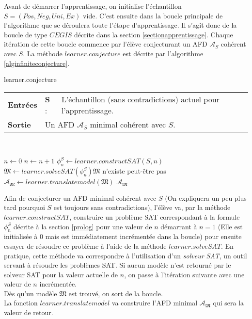 \documentclass[12pt,a4paper,oneside,titlepage]{report}
\begin{document}
\noindent Avant de démarrer l'apprentissage, on initialise l'échantillon $S=(Pos,Neg,Uni,Ex)$ vide. C'est ensuite dans la boucle principale de l'algorithme que se déroulera toute l'étape d'apprentissage. Il s'agit donc de la boucle de type $CEGIS$ décrite dans la section \ref{sectionapprentissage}. Chaque itération de cette boucle commence par l'élève conjecturant un AFD $\mathcal{A}_S$ cohérent avec $S$. La méthode $learner.conjecture$ est décrite par l'algorithme \ref{alginfiniteconjecture}.

\begin{algorithm}[H]
\caption{learner.conjecture}\label{alginfiniteconjecture}
\hspace*{\algorithmicindent} 
\begin{tabular}{lll}
	\textbf{Entrées} & \textbf{S} : &L'échantillon (sans contradictions) actuel pour l'apprentissage.\\
	\textbf{Sortie} &\multicolumn{2}{l}{Un AFD $\mathcal{A}_S$ minimal cohérent avec $S$.}\\
\end{tabular}\\
\begin{algorithmic}[1]
\State $n\gets 0$
\Repeat
	\State $n\gets n+1$
	\State $\phi_n^S\gets learner.constructSAT(S,n)$
	\State $\mathfrak{M} \gets learner.solveSAT(\phi_n^S)$\Comment $\mathfrak{M}$ n'existe peut-être pas
\State $\mathcal{A}_\mathfrak{M}\gets learner.translatemodel(\mathfrak{M})$
\State\Return $\mathcal{A}_\mathfrak{M}$
\end{algorithmic}
\end{algorithm}
Afin de conjecturer un AFD minimal cohérent avec $S$ (On expliquera un peu plus tard pourquoi $S$ est toujours sans contradictions), l'élève va, par la méthode $learner.constructSAT$, construire un problème SAT correspondant à la formule $\phi_n^S$ décrite à la section \ref{prolog} pour une valeur de $n$ démarrant à $n=1$ (Elle est initialisée à $0$ mais est immédiatement incrémentée dans la boucle) pour ensuite essayer de résoudre ce problème à l'aide de la méthode $learner.solveSAT$. En pratique, cette méthode va correspondre à l'utilisation d'un \emph{solveur SAT}, un outil servant à résoudre les problèmes SAT. Si aucun modèle n'est retourné par le solveur SAT pour la valeur actuelle de $n$, on passe à l'itération suivante avec une valeur de $n$ incrémentée.\\
Dès qu'un modèle $\mathfrak{M}$ est trouvé, on sort de la boucle.\\
La fonction $learner.translatemodel$ va construire l'AFD minimal $\mathcal{A}_\mathfrak{M}$ qui sera la valeur de retour.
\end{document}
